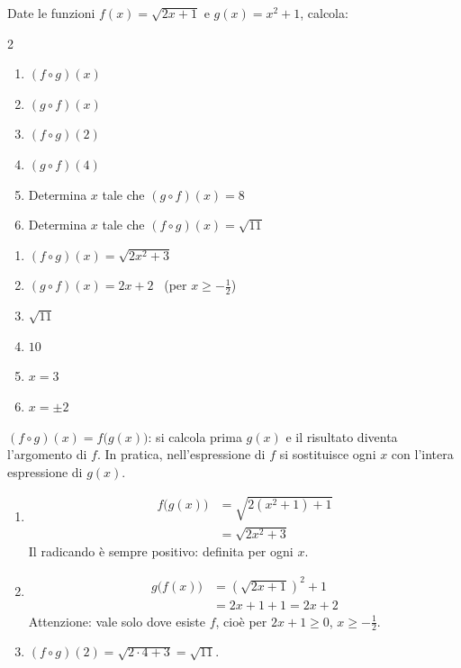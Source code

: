 \begin{question}[ID=1.4, subtitle={Composizione di funzioni con radicali}, difficulty=media, tags={funzioni, composizione}]
Date le funzioni $f(x)=\sqrt{2x+1}$ e $g(x)=x^2+1$, calcola:
\begin{multicols}{2}
\begin{enumerate}[leftmargin=3.2cm]
    \item $(f\circ g)(x)$
    \item $(g\circ f)(x)$
    \item $(f\circ g)(2)$
    \item $(g\circ f)(4)$
    \item Determina $x$ tale che $(g\circ f)(x)=8$
    \item Determina $x$ tale che $(f\circ g)(x)=\sqrt{11}$
\end{enumerate}
\end{multicols}
\begin{solution}
\begin{enumerate}
    \item $(f\circ g)(x)=\sqrt{2x^2+3}$
    \item $(g\circ f)(x)=2x+2$ \ (per $x\geq-\tfrac12$)
    \item $\sqrt{11}$
    \item $10$
    \item $x=3$
    \item $x=\pm2$
\end{enumerate}
\end{solution}
\begin{explanation}
$(f\circ g)(x)=f\big(g(x)\big)$: si calcola prima $g(x)$ e il risultato diventa l'argomento di $f$. In pratica, nell'espressione di $f$ si sostituisce ogni $x$ con l'intera espressione di $g(x)$.
\begin{enumerate}
    \item \[\begin{aligned}
    f\big(g(x)\big) &= \sqrt{2(x^2+1)+1}\\
    &= \sqrt{2x^2+3}
    \end{aligned}\]
    Il radicando è sempre positivo: definita per ogni $x$.
    \item \[\begin{aligned}
    g\big(f(x)\big) &= \left(\sqrt{2x+1}\right)^2+1\\
    &= 2x+1+1=2x+2
    \end{aligned}\]
    Attenzione: vale solo dove esiste $f$, cioè per $2x+1\geq0$, $x\geq-\tfrac12$.
    \item $(f\circ g)(2)=\sqrt{2\cdot4+3}=\sqrt{11}$.

\end{enumerate}
\end{explanation}
\end{question}
